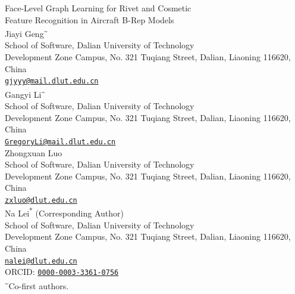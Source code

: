 \documentclass[12pt,a4paper]{article}
\date{}  %
\begin{document}
\linenumbers


\begin{center}
{\fontsize{20.74}{24.5}\selectfont Face-Level Graph Learning for Rivet and Cosmetic\\Feature Recognition in Aircraft B-Rep Models}
\\[5ex]

{\large Jiayi Geng\textsuperscript{\textasciitilde}} \\
{\small
School of Software, Dalian University of Technology \\
Development Zone Campus, No. 321 Tuqiang Street, Dalian, Liaoning 116620, China \\
\href{mailto:gjyyy@mail.dlut.edu.cn}{\nolinkurl{gjyyy@mail.dlut.edu.cn}}
} \\[1.2em]

{\large Gangyi Li\textsuperscript{\textasciitilde}} \\
{\small
School of Software, Dalian University of Technology \\
Development Zone Campus, No. 321 Tuqiang Street, Dalian, Liaoning 116620, China \\
\href{mailto:GregoryLi@mail.dlut.edu.cn}{\nolinkurl{GregoryLi@mail.dlut.edu.cn}}
} \\[1.2em]

{\large Zhongxuan Luo} \\
{\small
School of Software, Dalian University of Technology \\
Development Zone Campus, No. 321 Tuqiang Street, Dalian, Liaoning 116620, China \\
\href{mailto:zxluo@dlut.edu.cn}{\nolinkurl{zxluo@dlut.edu.cn}}
} \\[1.2em]

{\large Na Lei\textsuperscript{*} \small(Corresponding Author)} \\
{\small
School of Software, Dalian University of Technology \\
Development Zone Campus, No. 321 Tuqiang Street, Dalian, Liaoning 116620, China \\
\href{mailto:nalei@dlut.edu.cn}{\nolinkurl{nalei@dlut.edu.cn}} \\
ORCID: \href{https://orcid.org/0000-0003-3361-0756}{\nolinkurl{0000-0003-3361-0756}}
} \\[1.2em]

{\small \textsuperscript{\textasciitilde}Co-first authors.}
\end{center}
\end{document}
